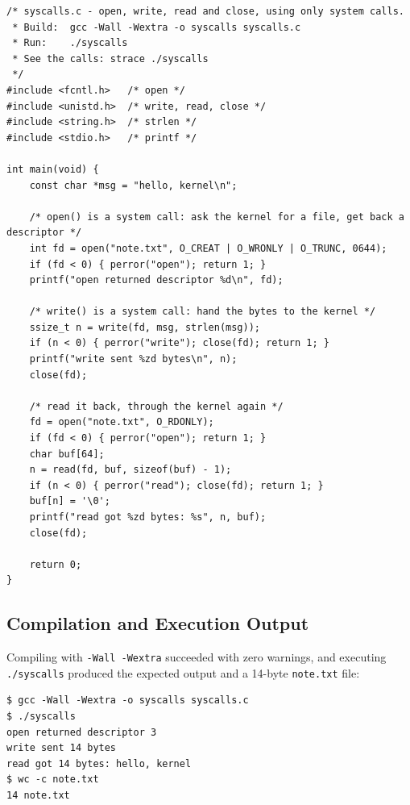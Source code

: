 \documentclass[12pt,a4paper]{article}
\begin{document}
\begin{lstlisting}[style=cstyle, caption={Implementation of syscalls.c using POSIX system calls directly}]
/* syscalls.c - open, write, read and close, using only system calls.
 * Build:  gcc -Wall -Wextra -o syscalls syscalls.c
 * Run:    ./syscalls
 * See the calls: strace ./syscalls
 */
#include <fcntl.h>   /* open */
#include <unistd.h>  /* write, read, close */
#include <string.h>  /* strlen */
#include <stdio.h>   /* printf */

int main(void) {
    const char *msg = "hello, kernel\n";

    /* open() is a system call: ask the kernel for a file, get back a descriptor */
    int fd = open("note.txt", O_CREAT | O_WRONLY | O_TRUNC, 0644);
    if (fd < 0) { perror("open"); return 1; }
    printf("open returned descriptor %d\n", fd);

    /* write() is a system call: hand the bytes to the kernel */
    ssize_t n = write(fd, msg, strlen(msg));
    if (n < 0) { perror("write"); close(fd); return 1; }
    printf("write sent %zd bytes\n", n);
    close(fd);

    /* read it back, through the kernel again */
    fd = open("note.txt", O_RDONLY);
    if (fd < 0) { perror("open"); return 1; }
    char buf[64];
    n = read(fd, buf, sizeof(buf) - 1);
    if (n < 0) { perror("read"); close(fd); return 1; }
    buf[n] = '\0';
    printf("read got %zd bytes: %s", n, buf);
    close(fd);

    return 0;
}
\end{lstlisting}

\subsection{Compilation and Execution Output}
Compiling with \texttt{-Wall -Wextra} succeeded with zero warnings, and executing \texttt{./syscalls} produced the expected output and a 14-byte \texttt{note.txt} file:
\begin{lstlisting}[style=consolestyle]
$ gcc -Wall -Wextra -o syscalls syscalls.c
$ ./syscalls
open returned descriptor 3
write sent 14 bytes
read got 14 bytes: hello, kernel
$ wc -c note.txt
14 note.txt
\end{lstlisting}
\end{document}
